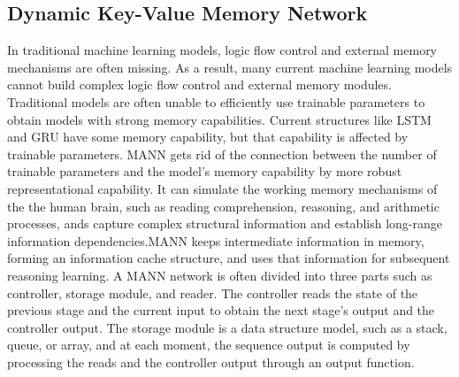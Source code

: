 \subsection{Dynamic Key-Value Memory Network}


In traditional machine learning models, logic flow control and external memory mechanisms are often missing. As a result, many current machine learning models cannot build complex logic flow control and external memory modules. Traditional models are often unable to efficiently use trainable parameters to obtain models with strong memory capabilities. Current structures like LSTM and GRU have some memory capability, but that capability is affected by trainable parameters. MANN gets rid of the connection between the number of trainable parameters and the model's memory capability by more robust representational capability. It can simulate the working memory mechanisms of the the human brain, such as reading comprehension, reasoning, and arithmetic processes, ands capture complex structural information and establish long-range information dependencies.MANN keeps intermediate information in memory, forming an information cache structure, and uses that information for subsequent reasoning learning. A MANN network is often divided into three parts such as controller, storage module, and reader. The controller reads the state of the previous stage and the current input to obtain the next stage's output and the controller output. The storage module is a data structure model, such as a stack, queue, or array, and at each moment, the sequence output is computed by processing the reads and the controller output through an output function.

